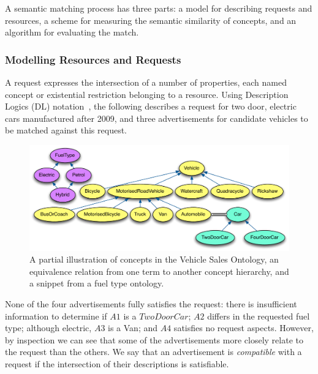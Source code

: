 \documentclass[12pt,a4paper,twoside,openright]{book}
\begin{document}
A semantic matching process has three parts: a model for describing requests and resources, a scheme for measuring the semantic similarity of concepts, and an algorithm for evaluating the match.

\subsubsection{Modelling Resources and Requests}
A request expresses the intersection of a number of properties, each named concept or existential restriction belonging to a resource. Using Description Logics (DL) notation~\cite{baader2003description}, the following describes a request for two door, electric cars manufactured after 2009, and three advertisements for candidate vehicles to be matched against this request. 

\begin{samepage}
\end{samepage}
\begin{figure}
\centering
\includegraphics[width=\columnwidth]{img/concept_hierarchy}

\caption[Partial illustration of concepts in the Vehicle Sales Ontology]{A partial illustration of concepts in the Vehicle Sales Ontology, an equivalence relation from one term to another concept hierarchy, and a snippet from a fuel type ontology.} 
\label{fig:concept_hierarchy}
\end{figure}

None of the four advertisements fully satisfies the request: there is insufficient information to determine if $A1$ is a $TwoDoorCar$; $A2$ differs in the requested fuel type; although electric, $A3$ is a Van; and $A4$ satisfies no request aspects.
%
However, by inspection we can see that some of the advertisements more closely relate to the request than the others.
%
We say that an advertisement is \emph{compatible} with a request if the intersection of their descriptions is satisfiable.
\end{document}
